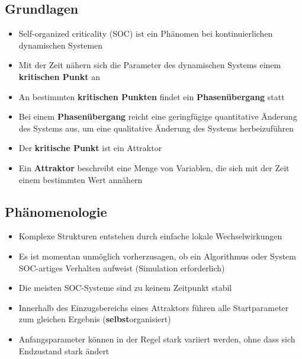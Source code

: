 \documentclass{beamer}
\begin{document}
\subsection{Grundlagen}
\begin{frame}{\insertsection}{\insertsubsection}
	\begin{itemize}
		\item Self-organized criticality (SOC) ist ein Phänomen bei kontinuierlichen dynamischen
            Systemen
        \pause
        \item Mit der Zeit nähern sich die Parameter des dynamischen Systems einem
            \textbf{kritischen Punkt} an
        \pause
        \item An bestimmten \textbf{kritischen Punkten} findet ein \textbf{Phasenübergang} statt
        \pause
        \item Bei einem \textbf{Phasenübergang} reicht eine geringfügige quantitative Änderung des Systems
            aus, um eine qualitative Änderung des Systems herbeizuführen
        \pause
        \item Der \textbf{kritische Punkt} ist ein Attraktor
        \item Ein \textbf{Attraktor} beschreibt eine Menge von Variablen, die sich mit der Zeit
            einem bestimmten Wert annähern
	\end{itemize}
\end{frame}

\subsection{Phänomenologie}
\begin{frame}{\insertsection}{\insertsubsection}
	\begin{itemize}
		\item Komplexe Strukturen entstehen durch einfache lokale Wechselwirkungen
        \pause
		\item Es ist momentan unmöglich vorherzusagen, ob ein Algorithmus oder System
            SOC-artiges Verhalten aufweist (Simulation erforderlich)
        \pause
        \item Die meisten SOC-Systeme sind zu keinem Zeitpunkt stabil
        \pause
        \item Innerhalb des Einzugsbereichs eines Attraktors führen alle Startparameter zum gleichen
            Ergebnis (\textbf{selbst}organisiert)
        \item Anfangsparameter können in der Regel stark variiert werden, ohne dass sich Endzustand stark ändert
	\end{itemize}
\end{frame}
\end{document}
